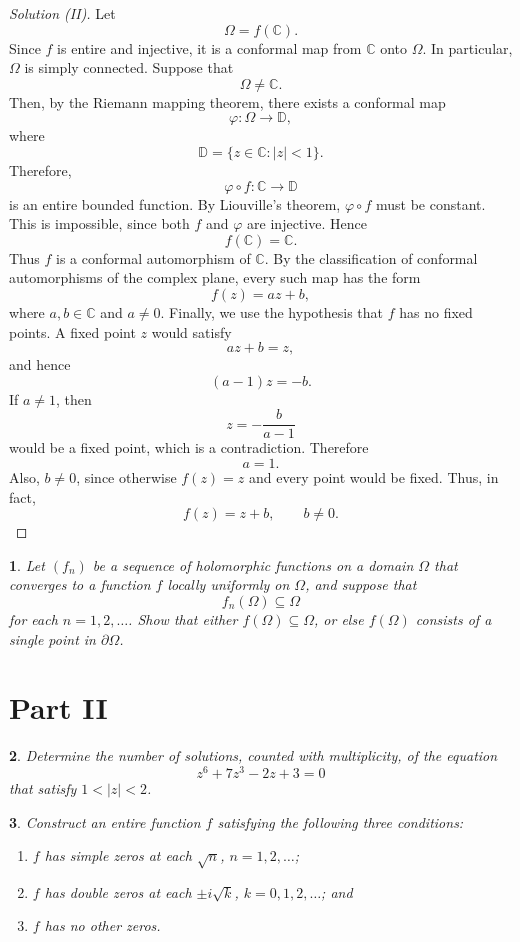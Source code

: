 \documentclass[12pt, a4paper]{report}
\theoremstyle{spaced}
\newtheorem{exercise}{}
\begin{document}
\begin{proof}[Solution (II)]
	Let
	\[
		\Omega=f(\mathbb{C}).
	\]
	Since $f$ is entire and injective, it is a conformal map from $\mathbb{C}$
	onto $\Omega$. In particular, $\Omega$ is simply connected.
	Suppose that
	\[
		\Omega\neq\mathbb{C}.
	\]
	Then, by the Riemann mapping theorem, there exists a conformal map
	\[
		\varphi:\Omega\to\mathbb{D},
	\]
	where
	\[
		\mathbb{D}=\{z\in\mathbb{C}:|z|<1\}.
	\]
	Therefore,
	\[
		\varphi\circ f:\mathbb{C}\to\mathbb{D}
	\]
	is an entire bounded function. By Liouville's theorem, $\varphi\circ f$
	must be constant. This is impossible, since both $f$ and $\varphi$ are
	injective.
	Hence
	\[
		f(\mathbb{C})=\mathbb{C}.
	\]
	Thus $f$ is a conformal automorphism of $\mathbb{C}$. By the
	classification of conformal automorphisms of the complex plane, every
	such map has the form
	\[
		f(z)=az+b,
	\]
	where $a,b\in\mathbb{C}$ and $a\neq 0$.
	Finally, we use the hypothesis that $f$ has no fixed points. A fixed
	point $z$ would satisfy
	\[
		az+b=z,
	\]
	and hence
	\[
		(a-1)z=-b.
	\]
	If $a\neq 1$, then
	\[
		z=-\frac{b}{a-1}
	\]
	would be a fixed point, which is a contradiction. Therefore
	\[
		a=1.
	\]
	Also, $b\neq 0$, since otherwise $f(z)=z$ and every point would be fixed.
	Thus, in fact,
	\[
		f(z)=z+b,
		\qquad b\neq 0.
	\]
\end{proof}
\begin{exercise}
	Let \((f_n)\) be a sequence of holomorphic functions on a domain \(\Omega\)
	that converges to a function \(f\) locally uniformly on \(\Omega\), and suppose
	that
	\[
		f_n(\Omega)\subseteq\Omega
	\]
	for each \(n=1,2,\ldots\). Show that either \(f(\Omega)\subseteq\Omega\), or
	else \(f(\Omega)\) consists of a single point in \(\partial\Omega\).
\end{exercise}

\section{Part II}
\begin{exercise}
	Determine the number of solutions, counted with multiplicity, of the equation
	\[
		z^6+7z^3-2z+3=0
	\]
	that satisfy \(1<|z|<2\).
\end{exercise}

\begin{exercise}
	Construct an entire function \(f\) satisfying the following three conditions:
	\begin{enumerate}
		\item[(a)] \(f\) has simple zeros at each \(\sqrt{n}\),
			\(n=1,2,\ldots\);
		\item[(b)] \(f\) has double zeros at each \(\pm i\sqrt{k}\),
			\(k=0,1,2,\ldots\); and
		\item[(c)] \(f\) has no other zeros.
	\end{enumerate}
\end{exercise}
\end{document}
